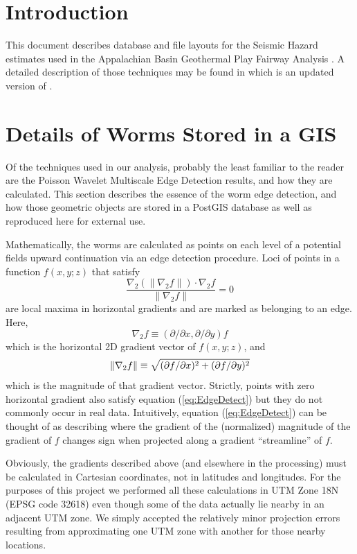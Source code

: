 \documentclass[extra]{article}
\begin{document}
\section{Introduction}
This document describes database and file layouts for the Seismic Hazard estimates used in the Appalachian Basin Geothermal Play Fairway Analysis \citep[GPFA-AB; ][]{GPFA-AB-Phase1FinalReport15}.  A detailed description of those techniques may be found in \citet{GPFASeismicHazardSGW15} which is an
updated version of \citet{GPFAFaultMemo15}.

\section{Details of Worms Stored in a GIS}
\label{app:WormGISDetails}
Of the techniques used in our analysis, probably the least familiar to the reader are the Poisson Wavelet Multiscale Edge Detection \citep[`worm' for brevity; ][]{WaveletTheory} results, and how they are calculated. This section describes the essence of the worm edge detection, and how those geometric objects are stored in a PostGIS database as well as reproduced here for external use.

Mathematically, the worms are calculated as points on each level of a potential fields upward continuation \citep[e.g. ][pp 313-314]{Blakely} via an edge detection procedure. Loci of points in a function \(f(x,y;z)\) that satisfy
 \begin{equation} \label{eq:EdgeDetect}
 \frac{\nabla_2 (\|\nabla_2 f\|) \cdot \nabla_2 f}{\|\nabla_2 f\|} = 0 
 \end{equation}
 are local maxima in horizontal gradients and are marked as belonging to an edge. Here, \[ \nabla_2 f \equiv (\partial/\partial x, \partial/\partial y) f \]  which is the horizontal 2D gradient vector of \(f(x,y;z)\),  and \[ \|\nabla_2 f\| \equiv  \sqrt{(\partial f/\partial x)^2 + (\partial f/\partial y)^2}\/\] which is the magnitude of that gradient vector. Strictly, points with zero horizontal gradient also satisfy equation (\ref{eq:EdgeDetect}) but they do not commonly occur in real data.
Intuitively, equation (\ref{eq:EdgeDetect}) can be thought of as describing where the gradient of the (normalized) magnitude of the gradient of \(f\) changes sign when projected along a gradient ``streamline'' of \(f\). 

Obviously, the gradients described above (and elsewhere in the processing) must be calculated in Cartesian coordinates, not in latitudes and longitudes. For the purposes of this project we performed all these calculations in UTM Zone 18N (EPSG code 32618) even though some of the data actually lie nearby in an adjacent UTM zone.  We simply accepted the relatively minor projection errors resulting from approximating one UTM zone with another for those nearby locations.
\end{document}

